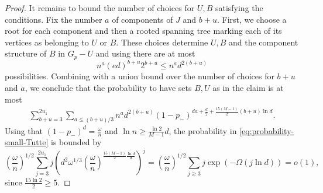 \documentclass[notitlepage]{scrartcl}
\newcommand{\cP}{\mathcal{P}}
\begin{document}
\begin{proof}
It remains to bound the number of choices for $U, B$ satisfying the conditions. Fix the number $a$ of components of $J$ and $b+u$. First, we choose a root for each component and then a rooted spanning tree marking each of its vertices as belonging to $U$ or $B$. These choices determine $U, B$ and the component structure of $B$ in $G_p-U$ and using  there are at most
\[
n^a (ed)^{b+u} 2^{b+u} \leq n^a d^{2(b+u)}
\]
possibilities.
Combining with a union bound over the number of choices for $b+u$ and $a$, we conclude that the probability to have sets $B, U$ as in the claim is at most
\begin{align} \label{eq:probability-small-Tutte}
    \sum_{b+u=3}^{2u_1} \sum_{a \leq (b+u)/3} n^a d^{2(b+u)} (1-p_-)^{da + \frac{d}{2}+\frac{15(M-1)}{2} (b+u) \ln d}.
\end{align}
Using that $(1-p_-)^d= \frac{\omega}{n}$ and $\ln n \geq \frac{\ln 2}{M-1} d$, the probability in \eqref{eq:probability-small-Tutte} is bounded by
\[
\left(\frac{\omega}{n} \right)^{1/2} \sum_{j=3}^{2 u_1} j \left(d^2 \omega^{1/3} \left( \frac{\omega}{n}\right)^{\frac{15(M-1)}{2} \frac{\ln d}{d}} \right)^j = \left(\frac{\omega}{n} \right)^{1/2} \sum_{j\geq 3} j \exp\left( - \Omega(j \ln d)\right) = o(1),
\]
since $\frac{15 \ln 2}{2} \geq 5$.




\end{proof}
\end{document}
